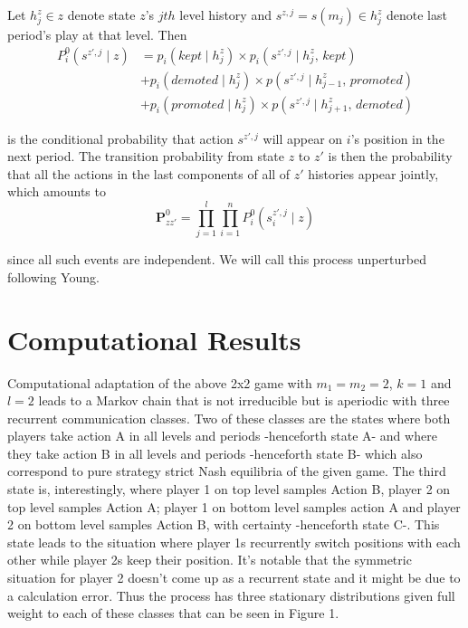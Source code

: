 \documentclass[11pt, a4paper, leqno]{article}
\begin{document}
Let $ h^z_j \in z $ denote state $z$'s $jth$ level history and $s^{z,j} = s(m_j) \in h^z_j$ denote last period's play at that level. Then
\begin{align*}
    P_{i}^0( s^{z',j} \mid z ) &= p_i(kept \mid h^z_j) \times p_i( s^{z',j} \mid h^z_j \textit{, kept})\\
    &+ p_i(demoted \mid h^z_j) \times p(s^{z',j} \mid h^z_{j-1} \textit{, promoted}) \\
   &+ p_i(promoted \mid h^z_j) \times p(s^{z',j}\mid h^z_{j+1} \textit{, demoted})
\end{align*}

is the conditional probability that action $s^{z',j}$ will appear on $i$'s position in the next period. The transition probability from state $z$ to $z'$ is then the probability that all the actions in the last components of all of $z'$ histories appear jointly, which amounts to
\[ \mathbf{P}_{zz'}^0 = \prod\limits_{j=1}^{l} \prod\limits_{i=1}^{n} P_{i}^0( s^{z',j}_i \mid z )\]

since all such events are independent. We will call this process unperturbed following Young. 



\section*{Computational Results}

Computational adaptation of the above 2x2 game with $m_1=m_2=2$, $k=1$ and $l=2$ leads to 
a Markov chain that is not irreducible but is aperiodic with three recurrent communication 
classes. Two of these classes are the states where both players take action A in all levels 
and periods -henceforth state A-  and where they take action B in all levels and periods 
-henceforth state B- which also correspond to pure strategy strict Nash equilibria of the 
given game. The third state is, interestingly, where player 1 on top level samples Action B, 
player 2 on top level samples Action A; player 1 on bottom level samples action A and player 2
on bottom level samples Action B, with certainty -henceforth state C-. This state leads to the situation where 
player 1s recurrently switch positions with each other while player 2s keep their position.
It's notable that the symmetric situation for player 2 doesn't come up as a recurrent state
and it might be due to a calculation error. Thus the process has three stationary distributions
given full weight to each of these classes that can be seen in Figure 1.
\end{document}
